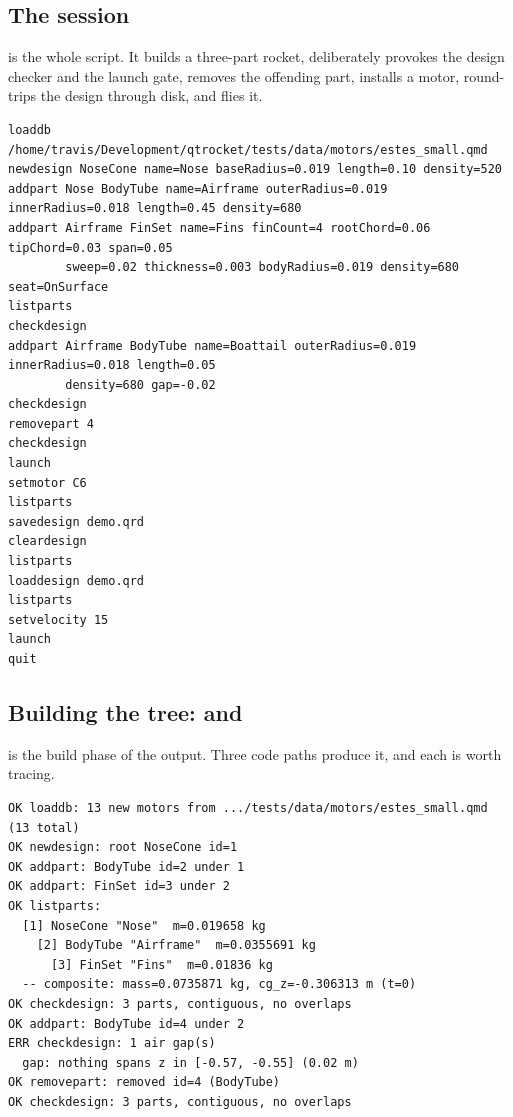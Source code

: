 \subsection{The session}\label{sec:cli-session}

 is the whole script. It builds a three-part rocket, deliberately provokes the
design checker and the launch gate, removes the offending part, installs a motor, round-trips the
design through disk, and flies it.

\begin{listing}[htbp]
\begin{verbatim}
loaddb /home/travis/Development/qtrocket/tests/data/motors/estes_small.qmd
newdesign NoseCone name=Nose baseRadius=0.019 length=0.10 density=520
addpart Nose BodyTube name=Airframe outerRadius=0.019 innerRadius=0.018 length=0.45 density=680
addpart Airframe FinSet name=Fins finCount=4 rootChord=0.06 tipChord=0.03 span=0.05
        sweep=0.02 thickness=0.003 bodyRadius=0.019 density=680 seat=OnSurface
listparts
checkdesign
addpart Airframe BodyTube name=Boattail outerRadius=0.019 innerRadius=0.018 length=0.05
        density=680 gap=-0.02
checkdesign
removepart 4
checkdesign
launch
setmotor C6
listparts
savedesign demo.qrd
cleardesign
listparts
loaddesign demo.qrd
listparts
setvelocity 15
launch
quit
\end{verbatim}
\caption{The session script (each  is one line; two are wrapped here to fit the
page). Run as ; the same commands work interactively or via
.}\label{lst:cli-script}
\end{listing}

\subsection[Building the tree: newdesign and addpart]{Building the tree:  and }\label{sec:cli-build}

 is the build phase of the output. Three code paths produce it, and each is
worth tracing.

\begin{listing}[htbp]
\begin{verbatim}
OK loaddb: 13 new motors from .../tests/data/motors/estes_small.qmd (13 total)
OK newdesign: root NoseCone id=1
OK addpart: BodyTube id=2 under 1
OK addpart: FinSet id=3 under 2
OK listparts:
  [1] NoseCone "Nose"  m=0.019658 kg
    [2] BodyTube "Airframe"  m=0.0355691 kg
      [3] FinSet "Fins"  m=0.01836 kg
  -- composite: mass=0.0735871 kg, cg_z=-0.306313 m (t=0)
OK checkdesign: 3 parts, contiguous, no overlaps
OK addpart: BodyTube id=4 under 2
ERR checkdesign: 1 air gap(s)
  gap: nothing spans z in [-0.57, -0.55] (0.02 m)
OK removepart: removed id=4 (BodyTube)
OK checkdesign: 3 parts, contiguous, no overlaps
\end{verbatim}
\caption{Build-phase output (path elided to fit the line). Ids are handed out by the 
constructor in creation order; the boattail's id 4 is visible again in
.}\label{lst:cli-build}
\end{listing}

